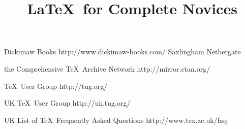 
\usepackage{fancybox}
\usepackage{tikz}
\usetikzlibrary{shapes}
\usetikzlibrary{decorations.pathmorphing}
\usepackage{caption,subcaption}
\usepackage{makeidx}
\usepackage{alltt}
\usepackage{amsmath}
\usepackage{amsfonts}
\usepackage{graphicx}
\usepackage{rotating}
\usepackage{booktabs}
\usepackage{pifont}

\usepackage{cmap}

\usepackage[utf8]{inputenc}
\usepackage[math]{anttor}
\usepackage{libris}
\renewcommand*{\ttdefault}{txtt}

\newcommand*{\docdate}{\formatdate{25}{9}{2012}}

\title[LaTeX for Complete Novices]{\LaTeX\ for Complete Novices}
\affiliation
 {Dickimaw Books}
 {http://www.dickimaw-books.com/}
 {Saxlingham Nethergate}
\subject{LaTeX}
\date{\docdate}

\html{}

\makeindex
\makeglossaries




 {the Comprehensive \TeX\ Archive Network}
 {http://mirror.ctan.org/}

%
 {\TeX\ User Group}%
 {http://tug.org/}

%
 {UK \TeX\ User Group}%
 {http://uk.tug.org/}

%
 {UK List of \TeX\ Frequently Asked Questions}%
 {http://www.tex.ac.uk/faq}





\newcommand{\xtableref}[1]{\objectref{Table}{#1}}

\newcommand{\figconts}[4][]{%
  \begin{makeimage}\end{makeimage}\figuretop{#4}
  \centering
  \incPgfOrGraphics[#1]{#2}%
  #3%
  \label{#4}%
}

